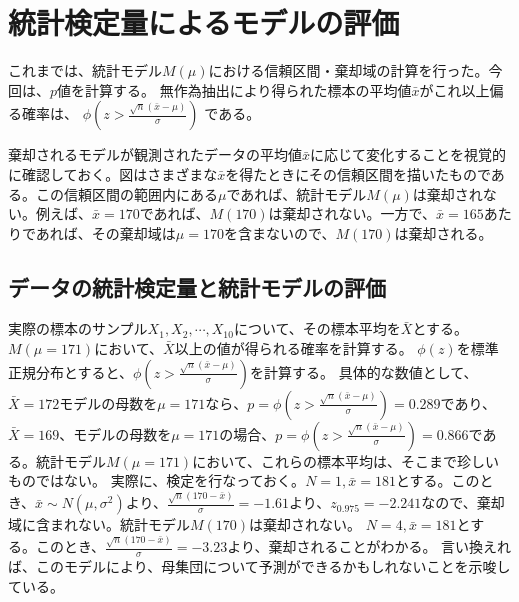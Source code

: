 \section{統計検定量によるモデルの評価}

これまでは、統計モデル$M(\mu)$における信頼区間・棄却域の計算を行った。今回は、$p$値を計算する。
無作為抽出により得られた標本の平均値$\bar{x}$がこれ以上偏る確率は、
$\phi(z>\frac{\sqrt{n}(\bar{x}-\mu)}{\sigma})$
である。



棄却されるモデルが観測されたデータの平均値$\bar{x}$に応じて変化することを視覚的に確認しておく。図はさまざまな$\bar{x}$を得たときにその信頼区間を描いたものである。この信頼区間の範囲内にある$\mu$であれば、統計モデル$M(\mu)$は棄却されない。例えば、$\bar{x}=170$であれば、$M(170)$は棄却されない。一方で、$\bar{x}=165$あたりであれば、その棄却域は$\mu=170$を含まないので、$M(170)$は棄却される。


\subsection{データの統計検定量と統計モデルの評価}
実際の標本のサンプル$X_1,X_2,\cdots,X_{10}$について、その標本平均を$\bar{X}$とする。$M(\mu=171)$において、$\bar{X}$以上の値が得られる確率を計算する。
$\phi(z)$を標準正規分布とすると、$\phi(z>\frac{\sqrt{n}(\bar{x}-\mu)}{\sigma})$を計算する。
具体的な数値として、
$\bar{X}=172$モデルの母数を$\mu=171$なら、$p=\phi(z>\frac{\sqrt{n}(\bar{x}-\mu)}{\sigma}) = 0.289$であり、$\bar{X}=169$、モデルの母数を$\mu=171$の場合、$p=\phi(z>\frac{\sqrt{n}(\bar{x}-\mu)}{\sigma}) = 0.866$である。統計モデル$M(\mu=171)$において、これらの標本平均は、そこまで珍しいものではない。
実際に、検定を行なっておく。$N=1,\bar{x}=181$とする。このとき、$\bar{x}\sim N(\mu,\sigma^2)$より、$\frac{\sqrt{n}(170-\bar{x})}{\sigma}=-1.61$より、$z_{0.975}=-2.241$なので、棄却域に含まれない。統計モデル$M(170)$は棄却されない。
$N=4,\bar{x}=181$とする。このとき、$\frac{\sqrt{n}(170-\bar{x})}{\sigma}=-3.23$より、棄却されることがわかる。
\fi
言い換えれば、このモデルにより、母集団について予測ができるかもしれないことを示唆している。

